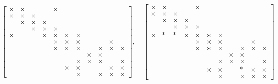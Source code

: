$$
\begin{bmatrix}
\times & \times &  &  & \times &  &  &  &  &  & \\
\times & \times & \times &  &  &  &  &  &  &  & \\
 & \times & \times & \times &  &  &  &  &  &  & \\
 &  & \times & \times & \times &  &  &  &  &  & \\
\times &  &  & \times & \times & \times & \times &  &  &  & \\
 &  &  &  & \times & \times & \times &  &  & \times & \\
 &  &  &  & \times & \times & \times &  & \times & \times & \times\\
 &  &  &  &  &  &  & \times & \times &  & \\
 &  &  &  &  &  & \times & \times & \times &  & \times\\
 &  &  &  &  & \times & \times &  &  & \times & \times\\
 &  &  &  &  &  & \times &  & \times & \times & \times\end{bmatrix}, \quad
\begin{bmatrix}
\times & \times &  &  & \times &  &  &  &  &  & \\
\times & \times & \times &  &  &  &  &  &  &  & \\
 & \times & \times & \times &  &  &  &  &  &  & \\
 &  & \times & \times & \times &  &  &  &  &  & \\
\times & * & * & \times & \times & \times & \times &  &  &  & \\
 &  &  &  & \times & \times & \times &  &  & \times & \\
 &  &  &  & \times & \times & \times &  & \times & \times & \times\\
 &  &  &  &  &  &  & \times & \times &  & \\
 &  &  &  &  &  & \times & \times & \times &  & \times\\
 &  &  &  &  & \times & \times &  & * & \times & \times\\
 &  &  &  &  &  & \times &  & \times & \times & \times\end{bmatrix}
$$
